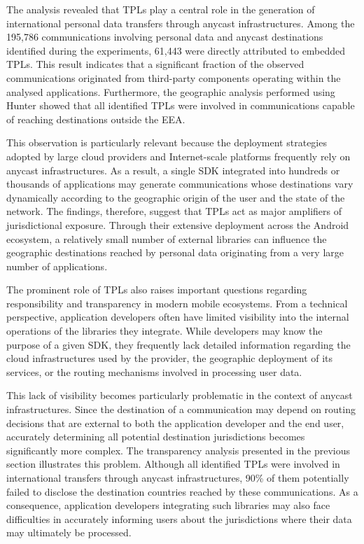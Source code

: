 The analysis revealed that TPLs play a central role in the generation of international personal data transfers through anycast infrastructures. Among the 195,786 communications involving personal data and anycast destinations identified during the experiments, 61,443 were directly attributed to embedded TPLs. This result indicates that a significant fraction of the observed communications originated from third-party components operating within the analysed applications. Furthermore, the geographic analysis performed using Hunter showed that all identified TPLs were involved in communications capable of reaching destinations outside the EEA.

This observation is particularly relevant because the deployment strategies adopted by large cloud providers and Internet-scale platforms frequently rely on anycast infrastructures. As a result, a single SDK integrated into hundreds or thousands of applications may generate communications whose destinations vary dynamically according to the geographic origin of the user and the state of the network. The findings, therefore, suggest that TPLs act as major amplifiers of jurisdictional exposure. Through their extensive deployment across the Android ecosystem, a relatively small number of external libraries can influence the geographic destinations reached by personal data originating from a very large number of applications.

The prominent role of TPLs also raises important questions regarding responsibility and transparency in modern mobile ecosystems. From a technical perspective, application developers often have limited visibility into the internal operations of the libraries they integrate. While developers may know the purpose of a given SDK, they frequently lack detailed information regarding the cloud infrastructures used by the provider, the geographic deployment of its services, or the routing mechanisms involved in processing user data. 

This lack of visibility becomes particularly problematic in the context of anycast infrastructures. Since the destination of a communication may depend on routing decisions that are external to both the application developer and the end user, accurately determining all potential destination jurisdictions becomes significantly more complex. The transparency analysis presented in the previous section illustrates this problem. Although all identified TPLs were involved in international transfers through anycast infrastructures, 90\% of them potentially failed to disclose the destination countries reached by these communications. As a consequence, application developers integrating such libraries may also face difficulties in accurately informing users about the jurisdictions where their data may ultimately be processed.

